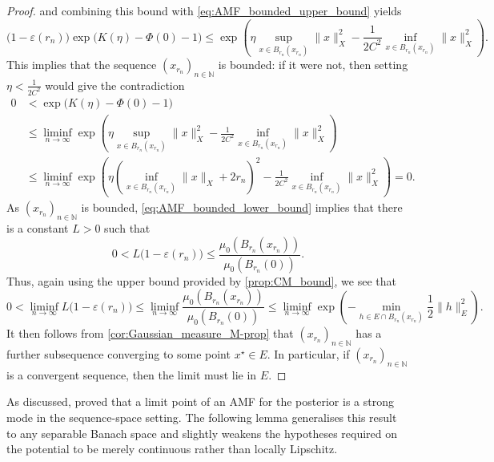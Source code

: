 \documentclass[11pt]{article}
\newcommand*{\cball}[2]{B_{#2}(#1)}
\newcommand*{\Naturals}{\mathbb{N}}
\renewcommand*{\leq}{\leqslant}
\theoremstyle{plain}
\theoremstyle{definition}
\newcommand{\norm}[1]{\lVert #1 \rVert}
\numberwithin{equation}{section}
\numberwithin{figure}{section}
\numberwithin{table}{section}
\begin{document}
\begin{proof}
	and combining this bound with \eqref{eq:AMF_bounded_upper_bound} yields
	\begin{equation*}
		 \bigl(1-\varepsilon(r_n)\bigr)\exp\bigl(K(\eta) - \Phi(0) - 1\bigr) \leq \exp\left(\eta \sup_{x \in \cball{x_{r_n}}{r_{n}}} \norm{x}_{X}^{2} - \frac{1}{2C^{2}} \inf_{x \in \cball{x_{r_n}}{r_{n}}} \norm{x}_{X}^2 \right).
	\end{equation*}
	This implies that the sequence $(x_{r_n})_{n \in \Naturals}$ is bounded:
	if it were not, then setting $\eta < \tfrac{1}{2C^{2}}$ would give the contradiction
	\begin{align*}
		0 &< \exp\bigl(K(\eta) - \Phi(0) - 1\bigr) \\
	      &\leq \liminf_{n \to \infty} \exp\left(\eta \sup_{x \in \cball{x_{r_n}}{r_{n}}} \norm{x}_{X}^{2} - \frac{1}{2C^{2}} \inf_{x \in \cball{x_{r_n}}{r_{n}}} \norm{x}_{X}^2 \right) \\
		  &\leq \liminf_{n \to \infty} \exp\left(\eta \left(\inf_{x \in \cball{x_{r_n}}{r_{n}}} \norm{x}_{X} + 2r_{n}\right)^{2} - \frac{1}{2C^{2}} \inf_{x \in \cball{x_{r_n}}{r_{n}}} \norm{x}_{X}^2 \right) = 0.
	\end{align*}
	As $(x_{r_{n}})_{n \in \Naturals}$ is bounded, \eqref{eq:AMF_bounded_lower_bound} implies that there is a constant $L > 0$ such that 
	\begin{equation*}
		0 < L \bigl(1 - \varepsilon(r_n)\bigr) \leq \frac{\mu_0(\cball{x_{r_{n}}}{r_{n}})}{\mu_0(\cball{0}{r_{n}})}.
	\end{equation*}
	Thus, again using the upper bound provided by \cref{prop:CM_bound}, we see that 
	\begin{equation*}
		0 < \liminf_{n \to \infty} L \bigl(1 - \varepsilon(r_n)\bigr) \leq \liminf_{n \to \infty} \frac{\mu_0(\cball{x_{r_{n}}}{r_{n}})}{\mu_0(\cball{0}{r_{n}})} \leq \liminf_{n \to \infty} \exp\left(-\min_{h \in E \cap \cball{x_{r_{n}}}{r_{n}}}\frac{1}{2} \|h\|_{E}^{2}\right).
	\end{equation*}
	It then follows from \cref{cor:Gaussian_measure_M-prop} that $(x_{r_n})_{n \in \Naturals}$ has a further subsequence converging to some point $x^{\star} \in E$.
	In particular, if $(x_{r_n})_{n \in \Naturals}$ is a convergent sequence, then the limit must lie in $E$.
\end{proof}

As discussed, \citet[Theorem~2.8]{KlebanovWacker2022} proved that a limit point of an AMF for the posterior is a strong mode in the sequence-space setting. 
The following lemma generalises this result to any separable Banach space and slightly weakens the hypotheses required on the potential to be merely continuous rather than locally Lipschitz.
\end{document}

